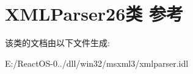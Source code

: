 \hypertarget{class_x_m_l_parser26}{}\section{X\+M\+L\+Parser26类 参考}
\label{class_x_m_l_parser26}


该类的文档由以下文件生成\+:\begin{DoxyCompactItemize}
\item 
E\+:/\+React\+O\+S-\/0../dll/win32/msxml3/xmlparser.\+idl\end{DoxyCompactItemize}
